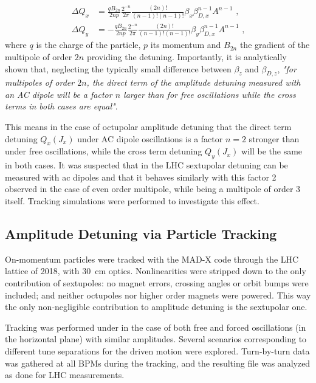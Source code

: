\begin{equation}
    \begin{aligned}
        \Delta Q_x &= \frac{q B_{2n}}{2np} \frac{2^{-n}}{2 \pi} \frac{(2n)!}{(n-1)! (n-1)!} \beta_x \beta_{D,x}^{n-1} A^{n-1} \text{ ,} \\
        \Delta Q_y &= -\frac{q B_{2n}}{2np} \frac{2^{-n}}{2 \pi} \frac{(2n)!}{(n-1)! (n-1)!} \beta_y \beta_{D,x}^{n-1} A^{n-1} \text{ ,}
    \end{aligned}
    \label{eqn:transverse_amp_det}
\end{equation}
where \(q\) is the charge of the particle, \(p\) its momentum and \(B_{2n}\) the gradient of the multipole of order \(2n\) providing the detuning.
Importantly, it is analytically shown that, neglecting the typically small difference between \(\beta_z\) and \(\beta_{D,z}\), \textit{"for multipoles of order \(2n\), the direct term of the amplitude detuning measured with an AC dipole will be a factor \(n\) larger than for free oscillations while the cross terms in both cases are equal"}.

This means in the case of octupolar amplitude detuning that the direct term detuning \(Q_{x}(J_{x})\) under AC dipole oscillations is a factor \(n = 2\) stronger than under free oscillations, while the cross term detuning \(Q_{y}(J_{x})\) will be the same in both cases.
It was suspected that in the LHC sextupolar detuning can be measured with ac dipoles and that it behaves similarly with this factor \num{2} observed in the case of even order multipole, while being a multipole of order \num{3} itself.
Tracking simulations were performed to investigate this effect.

\subsection*{Amplitude Detuning via Particle Tracking}

On-momentum particles were tracked with the MAD-X code through the LHC lattice of \num{2018}, with \qty{30}{\centi\meter} optics.
Nonlinearities were stripped down to the only contribution of sextupoles: no magnet errors, crossing angles or orbit bumps were included; and neither octupoles nor higher order magnets were powered.
This way the only non-negligible contribution to amplitude detuning is the sextupolar one.

Tracking was performed under in the case of both free and forced oscillations (in the horizontal plane) with similar amplitudes.
Several scenarios corresponding to different tune separations for the driven motion were explored.
Turn-by-turn data was gathered at all BPMs during the tracking, and the resulting file was analyzed as done for LHC measurements.

